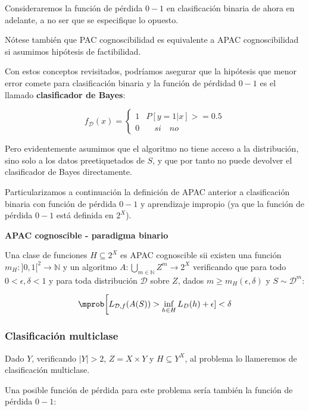 Consideraremos la función de pérdida $0-1$ en clasificación binaria de ahora en adelante, a no ser que se especifique
lo opuesto.

Nótese también que PAC cognoscibilidad es equivalente a APAC cognoscibilidad si asumimos hipótesis 
de factibilidad.

Con estos conceptos revisitados, podríamos asegurar que la hipótesis que menor error comete para 
clasificación binaria y la función de pérdidad $0-1$ es el llamado \textbf{clasificador de Bayes}:

\[f_{\mathcal{D}}(x) = \left\{\begin{array}{ll}
1 & P [y = 1 |x] >= 0.5\\
0 & \quad si \quad no
\end{array}\right.\]

Pero evidentemente asumimos que el algoritmo no tiene acceso a la distribución, sino solo a los datos 
preetiquetados de $S$, y que por tanto no puede devolver el clasificador de Bayes directamente.

Particularizamos a continuación la definición de APAC anterior a clasificación binaria
con función de pérdida $0-1$ y aprendizaje impropio (ya que la función de pérdida $0-1$ está definida 
en $2^X$).

\begin{definition} \textbf{APAC cognoscible - paradigma binario}

Una clase de funciones $H \subseteq 2^X$ es APAC cognoscible sii existen una función 
$m_{H} : ]0,1[^2\rightarrow \mathbb{N}$ y un algoritmo $A: \underset{m\in \mathbb{N}}{\bigcup} Z^m \rightarrow 2^X$ verificando que para todo
$0 < \epsilon, \delta < 1$ y para toda distribución $\mathcal{D}$ sobre $Z$, dados 
$m \ge m_H(\epsilon, \delta)$ y $S\sim \mathcal{D}^m$:

\[\mprob \bigg[L_{\mathcal{D},f}(A(S)) > \inf_{h\in H} L_D(h) + \epsilon] < \delta\]
\end{definition}

\subsubsection{Clasificación multiclase}

Dado $Y$, verificando $|Y| > 2$, $Z=X\times Y$ y $H\subseteq Y^X$, al problema lo llameremos de 
clasificación multiclase. 

Una posible función de pérdida para este problema sería también la función de pérdida $0-1$:

